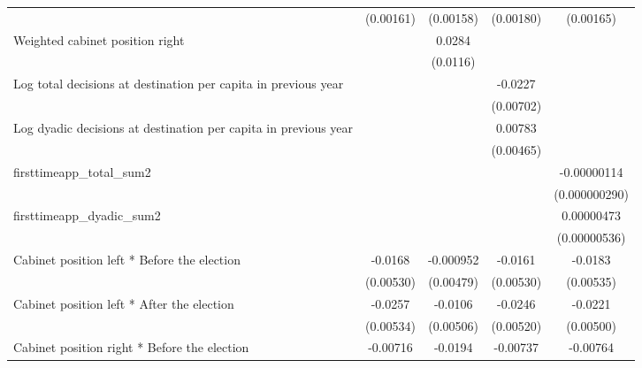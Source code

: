 \begin{table}[htbp]
\begin{tabular}{l*{4}{c}}
                    &   (0.00161)         &   (0.00158)         &   (0.00180)         &   (0.00165)         \\
[1em]
Weighted cabinet position right&                     &      0.0284\sym{*}  &                     &                     \\
                    &                     &    (0.0116)         &                     &                     \\
[1em]
Log total decisions at destination per capita in previous year&                     &                     &     -0.0227\sym{**} &                     \\
                    &                     &                     &   (0.00702)         &                     \\
[1em]
Log dyadic decisions at destination per capita in previous year&                     &                     &     0.00783         &                     \\
                    &                     &                     &   (0.00465)         &                     \\
[1em]
firsttimeapp\_total\_sum2&                     &                     &                     & -0.00000114\sym{***}\\
                    &                     &                     &                     &(0.000000290)         \\
[1em]
firsttimeapp\_dyadic\_sum2&                     &                     &                     &  0.00000473         \\
                    &                     &                     &                     &(0.00000536)         \\
[1em]
Cabinet position left * Before the election&     -0.0168\sym{**} &   -0.000952         &     -0.0161\sym{**} &     -0.0183\sym{**} \\
                    &   (0.00530)         &   (0.00479)         &   (0.00530)         &   (0.00535)         \\
[1em]
Cabinet position left * After the election&     -0.0257\sym{***}&     -0.0106\sym{*}  &     -0.0246\sym{***}&     -0.0221\sym{***}\\
                    &   (0.00534)         &   (0.00506)         &   (0.00520)         &   (0.00500)         \\
[1em]
Cabinet position right * Before the election&    -0.00716         &     -0.0194\sym{**} &    -0.00737         &    -0.00764         \\

\end{tabular}
\end{table}
